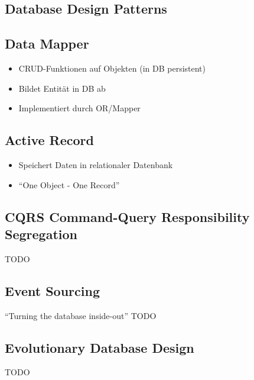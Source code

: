 \documentclass[a4paper, landscape, 8pt]{scrartcl}
\begin{document}
\begin{multicols*}{4}
        \section{Database Design Patterns}
        \subsection{Data Mapper}
        \begin{itemize}
            \item CRUD-Funktionen auf Objekten (in DB persistent)
            \item Bildet Entität in DB ab
            \item Implementiert durch OR/Mapper
        \end{itemize}

        \subsection{Active Record}
        \begin{itemize}
            \item Speichert Daten in relationaler Datenbank
            \item \enquote{One Object - One Record}
        \end{itemize}

        \subsection{CQRS {\tiny Command-Query Responsibility Segregation}}
        TODO

        \subsection{Event Sourcing}
        \enquote{Turning the database inside-out}
        TODO

        \subsection{Evolutionary Database Design}
        TODO

    \end{multicols*}
\end{document}
